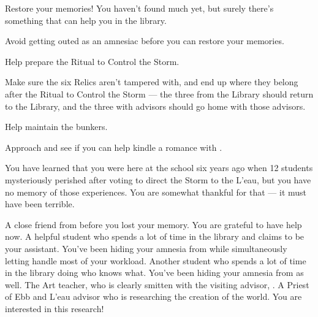 \documentclass[char]{GL2020}
\begin{document}
\begin{itemz}
	\item Restore your memories! You haven't found much yet, but surely there's something that can help you in the library.
	\item Avoid getting outed as an amnesiac before you can restore your memories.
	\item Help prepare the Ritual to Control the Storm.
	\item Make sure the six Relics aren't tampered with, and end up where they belong after the Ritual to Control the Storm — the three from the Library should return to the Library, and the three with advisors should go home with those advisors.
	\item Help maintain the bunkers.
	\item Approach \cChupAvenger{} and see if you can help \cChupAvenger{\them} kindle a romance with \cHeadScientist{}.
\end{itemz}

\begin{itemz}[Notes]
	\item You have learned that you were here at the school six years ago when 12 students mysteriously perished after voting to direct the Storm to the L'eau, but you have no memory of those experiences. You are somewhat thankful for that — it must have been terrible.
\end{itemz}

\begin{contacts}
	\contact{\cInterpol{}} A close friend from before you lost your memory. You are grateful to have \cInterpol{\their} help now.
	\contact{\cLibAssist{}} A helpful student who spends a lot of time in the library and claims to be your assistant. You've been hiding your amnesia from \cLibAssist{\them} while simultaneously letting \cLibAssist{\them} handle most of your workload.
	\contact{\cPresident{}} Another student who spends a lot of time in the library doing who knows what. You've been hiding your amnesia from \cPresident{\them} as well.
	\contact{\cChupAvenger{}} The Art teacher, who is clearly smitten with the visiting advisor, \cHeadScientist{}.
	\contact{\cEbbPriest{}} A Priest of Ebb and L'eau advisor who is researching the creation of the world. You are interested in this research!
\end{contacts}
\end{document}
